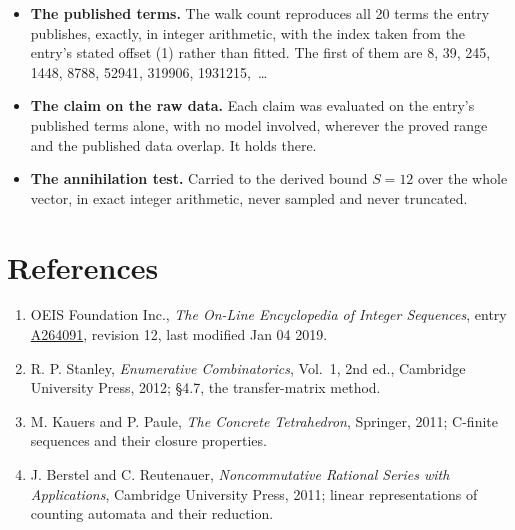 \documentclass[11pt]{article}
\theoremstyle{definition}
\begin{document}
\begin{itemize}

\item {\bfseries The published terms.} The walk count reproduces all 20 terms the entry publishes, exactly, in integer arithmetic, with the index taken from the entry's stated offset (1) rather than fitted. The first of them are 8, 39, 245, 1448, 8788, 52941, 319906, 1931215,~\dots

\item {\bfseries The claim on the raw data.} Each claim was evaluated on the entry's published terms alone, with no model involved, wherever the proved range and the published data overlap. It holds there.

\item {\bfseries The annihilation test.} Carried to the derived bound $S = 12$ over the whole vector, in exact integer arithmetic, never sampled and never truncated.

\end{itemize}

\section{References}

\begin{enumerate}

\item OEIS Foundation Inc., \emph{The On-Line Encyclopedia of Integer Sequences}, entry \href{https://oeis.org/A264091}{A264091}, revision 12, last modified Jan 04 2019.

\item R. P. Stanley, \emph{Enumerative Combinatorics}, Vol.~1, 2nd ed., Cambridge University Press, 2012; \S4.7, the transfer-matrix method.

\item M. Kauers and P. Paule, \emph{The Concrete Tetrahedron}, Springer, 2011; C-finite sequences and their closure properties.

\item J. Berstel and C. Reutenauer, \emph{Noncommutative Rational Series with Applications}, Cambridge University Press, 2011; linear representations of counting automata and their reduction.

\end{enumerate}
\end{document}
